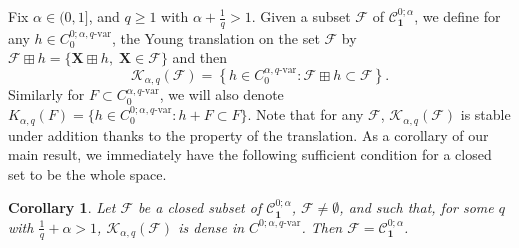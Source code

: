 \documentclass[12pt,a4paper]{article}
\numberwithin{equation}{section}
\def\cK{\mathcal{K}}\def\cC{\mathcal{C}}
\def\fX{\mathbf{X}}
\theoremstyle{plain}
\newtheorem{theorem}{Theorem}[section]
\newtheorem{corollary}[theorem]{Corollary}
\theoremstyle{definition}
\theoremstyle{remark}
\begin{document}
%
%
%
%
%
Fix $\alpha \in (0,1]$, and $q \geq 1$ with $\alpha + \frac{1}{q} > 1$. Given a subset $\mathcal{F}$ of $\mathcal{C}^{0;\alpha}_{\mathbf{1}}$, we define for any $h \in C^{0;\alpha,q\text{-var}}_0$, the Young translation on the set $\mathcal{F}$ by  $\mathcal{F}\boxplus h = \{ \fX \boxplus h, \; \fX \in \mathcal{F}\}$ and then
\begin{equation} \label{eq:defK}
\cK_{\alpha,q}({ \mathcal{F}}) = \left\{ h \in C^{\alpha,q\text{-var}}_0 : \mathcal F\boxplus h\subset \mathcal F \right\}.
\end{equation}
Similarly for $F \subset C^{\alpha,q\text{-var}}_0$, we will also denote $K_{\alpha,q}(F) = \{h \in C^{0;\alpha,q\text{-var}}_0: h+F \subset F \}$. Note that for any $\mathcal{F}$, $\cK_{\alpha,q}({ \mathcal{F}})$ is stable under addition thanks to the property of the translation. As a corollary of our main result, we immediately have the following sufficient condition for a closed set to be the whole space.

\begin{corollary} \label{cor:main}
Let $\mathcal{F}$ be a closed subset of $\mathcal{C}^{0;\alpha}_{\mathbf{1}}$, $\mathcal{F} \neq \emptyset$, and such that, for some $q$ with $\frac{1}{q}+\alpha>1$,  $\cK_{\alpha,q}({\mathcal{F}})$ is dense in $C^{0;\alpha,q\text{-var}}$. Then $\mathcal{F}= \mathcal{C}^{0;\alpha}_{\mathbf{1}}$.
\end{corollary}
\end{document}
